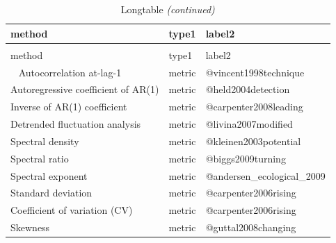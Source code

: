 \documentclass[12pt,twoside,openany]{reedthesis}
\newenvironment{Shaded}{\begin{snugshade}}{\end{snugshade}}
\newcommand{\KeywordTok}[1]{\textcolor[rgb]{0.13,0.29,0.53}{\textbf{#1}}}
\newcommand{\DataTypeTok}[1]{\textcolor[rgb]{0.13,0.29,0.53}{#1}}
\newcommand{\DecValTok}[1]{\textcolor[rgb]{0.00,0.00,0.81}{#1}}
\newcommand{\StringTok}[1]{\textcolor[rgb]{0.31,0.60,0.02}{#1}}
\newcommand{\OperatorTok}[1]{\textcolor[rgb]{0.81,0.36,0.00}{\textbf{#1}}}
\newcommand{\NormalTok}[1]{#1}
\begin{document}
\begin{longtable}{lll}
\caption{\label{tab:methodsMetricsListTab}Longtable}\\
\toprule
method & type1 & label2\\
\midrule
\endfirsthead
\caption[]{\label{tab:methodsMetricsListTab}Longtable \textit{(continued)}}\\
\toprule
method & type1 & label2\\
\midrule
\endhead
\
\endfoot
\bottomrule
\endlastfoot
Autocorrelation at-lag-1 & metric & @vincent1998technique\\
Autoregressive coefficient of AR(1) & metric & @held2004detection\\
Inverse of AR(1) coefficient & metric & @carpenter2008leading\\
Detrended fluctuation analysis & metric & @livina2007modified\\
Spectral density & metric & @kleinen2003potential\\
\addlinespace
Spectral ratio & metric & @biggs2009turning\\
Spectral exponent & metric & @andersen\_ecological\_2009\\
Standard deviation & metric & @carpenter2006rising\\
Coefficient of variation (CV) & metric & @carpenter2006rising\\
Skewness & metric & @guttal2008changing\\*
\end{longtable}
\begin{Shaded}
\end{Shaded}
\end{document}
